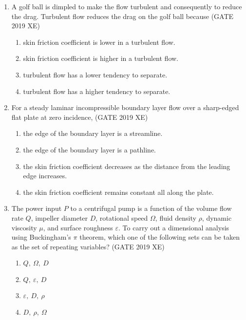 \documentclass[journal,12pt,onecolumn]{IEEEtran}
\begin{document}
\begin{enumerate}
\item A golf ball is dimpled to make the flow turbulent and consequently to reduce the drag. Turbulent flow reduces the drag on the golf ball because
\hfill{(GATE 2019 XE)} \\
\begin{multicols}{2}
\begin{enumerate}
\item skin friction coefficient is lower in a turbulent flow.
\item skin friction coefficient is higher in a turbulent flow.
\item turbulent flow has a lower tendency to separate.
\item turbulent flow has a higher tendency to separate.
\end{enumerate}
\end{multicols}

\item For a steady laminar incompressible boundary layer flow over a sharp-edged flat plate at zero incidence,
\hfill{(GATE 2019 XE)} \\
\begin{multicols}{2}
\begin{enumerate}
\item the edge of the boundary layer is a streamline.
\item the edge of the boundary layer is a pathline.
\item the skin friction coefficient decreases as the distance from the leading edge increases.
\item the skin friction coefficient remains constant all along the plate.
\end{enumerate}
\end{multicols}

\item The power input $P$ to a centrifugal pump is a function of the volume flow rate $Q$, impeller diameter $D$, rotational speed $\Omega$, fluid density $\rho$, dynamic viscosity $\mu$, and surface roughness $\varepsilon$. To carry out a dimensional analysis using Buckingham’s $\pi$ theorem, which one of the following sets can be taken as the set of repeating variables?
\hfill{(GATE 2019 XE)} \\
\begin{multicols}{2}
\begin{enumerate}
\item $Q,\ \Omega,\ D$
\item $Q,\ \varepsilon,\ D$
\item $\varepsilon,\ D,\ \rho$
\item $D,\ \rho,\ \Omega$
\end{enumerate}
\end{multicols}



\end{enumerate}
\end{document}

